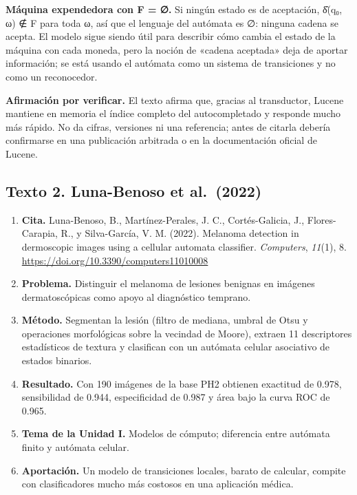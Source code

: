 \textbf{Máquina expendedora con F = ∅.} Si ningún estado es de aceptación, δ̂(q₀, ω) ∉ F para toda ω, así que el lenguaje del autómata es ∅: ninguna cadena se acepta. El modelo sigue siendo útil para describir cómo cambia el estado de la máquina con cada moneda, pero la noción de «cadena aceptada» deja de aportar información; se está usando el autómata como un sistema de transiciones y no como un reconocedor.

\textbf{Afirmación por verificar.} El texto afirma que, gracias al transductor, Lucene mantiene en memoria el índice completo del autocompletado y responde mucho más rápido. No da cifras, versiones ni una referencia; antes de citarla debería confirmarse en una publicación arbitrada o en la documentación oficial de Lucene.

\hypertarget{texto-2.-luna-benoso-et-al.-2022}{%
\subsection{Texto 2. Luna-Benoso et al.~(2022)}\label{texto-2.-luna-benoso-et-al.-2022}}

\begin{enumerate}
\def\labelenumi{\arabic{enumi}.}
\tightlist
\item
  \textbf{Cita.} Luna-Benoso, B., Martínez-Perales, J. C., Cortés-Galicia, J., Flores-Carapia, R., y Silva-García, V. M. (2022). Melanoma detection in dermoscopic images using a cellular automata classifier. \emph{Computers}, \emph{11}(1), 8. \url{https://doi.org/10.3390/computers11010008}
\item
  \textbf{Problema.} Distinguir el melanoma de lesiones benignas en imágenes dermatoscópicas como apoyo al diagnóstico temprano.
\item
  \textbf{Método.} Segmentan la lesión (filtro de mediana, umbral de Otsu y operaciones morfológicas sobre la vecindad de Moore), extraen 11 descriptores estadísticos de textura y clasifican con un autómata celular asociativo de estados binarios.
\item
  \textbf{Resultado.} Con 190 imágenes de la base PH2 obtienen exactitud de 0.978, sensibilidad de 0.944, especificidad de 0.987 y área bajo la curva ROC de 0.965.
\item
  \textbf{Tema de la Unidad I.} Modelos de cómputo; diferencia entre autómata finito y autómata celular.
\item
  \textbf{Aportación.} Un modelo de transiciones locales, barato de calcular, compite con clasificadores mucho más costosos en una aplicación médica.
\end{enumerate}

